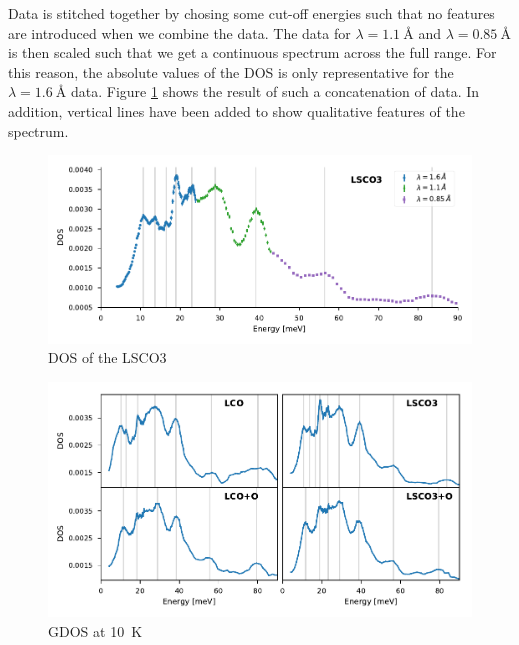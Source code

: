 Data is stitched together by chosing some cut-off energies such that no features are introduced when we combine the data. The data for $\lambda = \SI{1.1}{\angstrom}$ and $\lambda = \SI{0.85}{\angstrom}$ is then scaled such that we get a continuous spectrum across the full range. For this reason, the absolute values of the DOS is only representative for the $\lambda = \SI{1.6}{\angstrom}$ data. Figure \ref{fig:in4_stitch} shows the result of such a concatenation of data. In addition, vertical lines have been added to show qualitative features of the spectrum.

\begin{figure}
    \centering
    \includegraphics[width=\textwidth]{fig/gdos/in4_lsco3_10k.pdf}
    \caption[gDOS of LSCO3 at 10K. Visualize stitching of data.]{DOS of the LSCO3 }
    \label{fig:in4_stitch}
\end{figure}


\begin{figure}
    \centering
    \includegraphics[width=\textwidth]{fig/gdos/in4_10K.pdf}
    \caption[gDOS at \SI{10}{\kelvin}]{GDOS at \SI{10}{\kelvin}}
    \label{fig:gdos_10k}
\end{figure}

